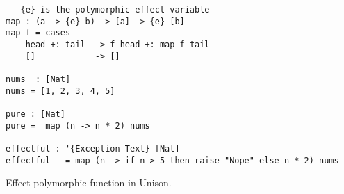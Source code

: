 \begin{algorithm}

\begin{verbatim}
-- {e} is the polymorphic effect variable
map : (a -> {e} b) -> [a] -> {e} [b]
map f = cases
    head +: tail  -> f head +: map f tail
    []            -> []

nums  : [Nat]
nums = [1, 2, 3, 4, 5]

pure : [Nat]
pure =  map (n -> n * 2) nums

effectful : '{Exception Text} [Nat]
effectful _ = map (n -> if n > 5 then raise "Nope" else n * 2) nums
\end{verbatim}

\caption{Effect polymorphic  function in Unison. \label{alg-eff:polymorphism-unison}}
\end{algorithm}